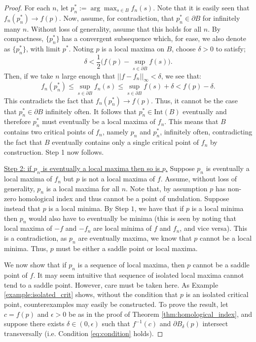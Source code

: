 \documentclass[11pt]{article}
\newcommand{\1}{\mathbf{1}}
\theoremstyle{definition}
\theoremstyle{remark}
\begin{document}
\begin{proof}
    For each $n$, let $p_n^*:=\arg\max_{s\in B}f_n(s)$. Note that it is easily seen that $f_n(p_n^*)\rightarrow f(p)$. Now, assume, for contradiction, that $p_n^*\in \partial B$ for infinitely many $n$. Without loss of generality, assume that this holds for all $n$. By compactness, $\{p_n^*\}$ has a convergent subsequence which, for ease, we also denote as $\{p_n^*\}$, with limit $p^*$. Noting $p$ is a local maxima on $B$, choose $\delta>0$ to satisfy; 
    \begin{equation}\nonumber
        \delta < \frac{1}{2}\bigg(f(p) - \sup_{s\in \partial B} f(s)\bigg).
    \end{equation}
    Then, if we take $n$ large enough that $||f-f_n||_\infty<\delta$, we see that:
    \begin{equation}\nonumber
        f_n(p_n^*)\leq \sup_{s \in \partial B} f_n(s) \leq \sup_{s \in \partial B} f(s) + \delta < f(p) - \delta.
    \end{equation}
    This contradicts the fact that $f_n(p_n^*)\rightarrow f(p)$. Thus, it cannot be the case that $p_n^*\in \partial B$ infinitely often. It follows that $p_n^*\in\text{Int}(B)$ eventually and therefore $p_n^*$ must eventually be a local maxima of $f_n$. This means that $B$ contains two critical points of $f_n$, namely $p_n$ and $p_n^*$, infinitely often, contradicting the fact that $B$ eventually contains only a single critical point of $f_n$ by construction. Step 1 now follows. 

    \underline{Step 2: if $p_n$ is eventually a local maxima then so is $p$.} Suppose $p_n$ is eventually a local maxima of $f_n$ but $p$ is not a local maxima of $f$. Assume, without loss of generality, $p_n$ is a local maxima for all $n$. Note that, by assumption $p$ has non-zero homological index and thus cannot be a point of undulation. Suppose instead that $p$ is a local minima. By Step $1$, we have that if $p$ is a local minima then $p_n$ would also have to eventually be minima (this is seen by noting that local maxima of $-f$ and $-f_n$ are local minima of $f$ and $f_n$, and vice versa). This is a contradiction, as $p_n$ are eventually maxima, we know that $p$ cannot be a local minima. Thus, $p$ must be either a saddle point or local maxima.
    

   We now show that if $p_n$ is a sequence of local maxima, then $p$ cannot be a saddle point of $f$. It may seem intuitive that sequence of isolated local maxima cannot tend to a saddle point. However, care must be taken here. As Example \ref{example:isolated_crit} shows, without the condition that $p$ is an isolated critical point, counterexamples may easily be constructed. To prove the result, let $c=f(p)$ and $\epsilon > 0$ be as in the proof of Theorem \ref{thm:homological_index}, and suppose there exists $\delta \in (0,\epsilon)$ such that $f^{-1}(c)$ and $\partial B_\delta(p)$ intersect transversally (i.e. Condition \eqref{eq:condition} holds).


\end{proof}
\end{document}
